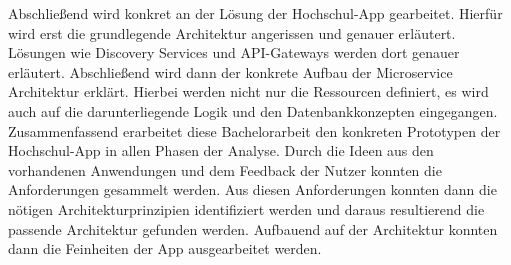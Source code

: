Abschließend wird konkret an der Lösung der Hochschul-App gearbeitet. Hierfür wird erst die grundlegende Architektur angerissen und genauer erläutert. Lösungen wie Discovery Services und API-Gateways werden dort genauer erläutert. Abschließend wird dann der konkrete Aufbau der Microservice Architektur erklärt. Hierbei werden nicht nur die Ressourcen definiert, es wird auch auf die darunterliegende Logik und den Datenbankkonzepten eingegangen.\\
Zusammenfassend erarbeitet diese Bachelorarbeit den konkreten Prototypen der Hochschul-App in allen Phasen der Analyse. Durch die Ideen aus den vorhandenen Anwendungen und dem Feedback der Nutzer konnten die Anforderungen gesammelt werden. Aus diesen Anforderungen konnten dann die nötigen Architekturprinzipien identifiziert werden und daraus resultierend die passende Architektur gefunden werden. Aufbauend auf der Architektur konnten dann die Feinheiten der App ausgearbeitet werden.
